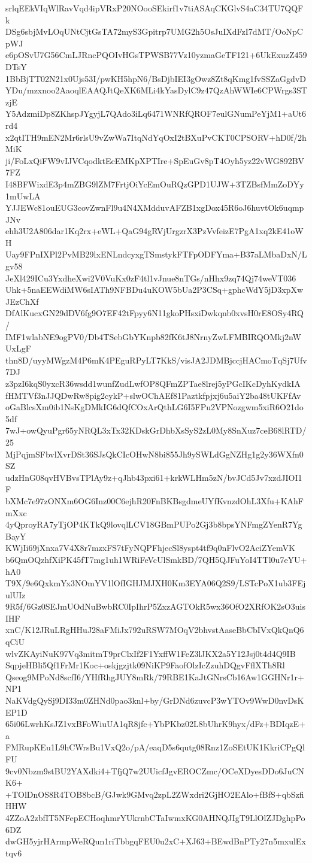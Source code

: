 srlqEEkVIqWlRavVqd4ipVRxP20NOooSEkirf1v7tiASAqCKGlvS4aC34TU7QQFk
DSg6sbjMvLOqUNtCjtGsTA72myS3Gpitrp7UMG2h5OsJuIXdFzI7dMT/OoNpCpWJ
e6pOSvU7G56CmLJRncPQOIvHGsTPWSB77Vz10yzmaGeTF121+6UkExuzZ459DTsY
1BbBjTT02N21x0Ujs53I/pwKH5hpN6/BsDjbIEI3gOwz8Zt8qKmg1fvSSZaGgdvD
YDu/mzxnoo2AaoqlEAAQJtQeXK6MLi4kYasDylC9z47QzAhWWIe6CPWrgs3STzjE
Y5AdzmiDp8ZKhspJYgyjL7QAdo3iLq6471WNRfQROF7eulGNumPeYjM1+aUt6rd4
x2qtITH9mEN2Mr6rlsU9vZwWa7ItqNdYqOxI2tBXuPvCKT0CPSORV+hD0f/2hMiK
ji/FoLxQiFW9vIJVCqodktEcEMKpXPTIre+SpEuGv8pT4Oyh5yz22vWG892BV7FZ
I48BFWixdE3p4mZBG9lZM7FrtjOiYcEmOuRQzGPD1UJW+3TZBsfMmZoDYy1mUwLA
YJJEWc81ouEUG3covZwnFl9u4N4XMdduvAFZB1xgDox45R6oJ6huvtOk6uqmpJNv
ehh3U2A806dar1Kq2rx+eWL+QaG94gRVjUrgzrX3PzVvfeizE7PgA1xq2kE41oWH
Uay9FPnIXPl2PvMB29lxENLndcyxgTSmstykFTFpODFYma+B37aLMbaDxN/Lgv58
JeXl429ICu3YxdheXwi2V0VuKx0zF4tl1vJnue8nTGs/nHhx9zq74Qj74weVT036
Uhk+5naEEWdiMW6sIATh9NFBDu4uKOW5bUa2P3CSq+gphcWdY5jD3xpXwJEzChXf
DfAlKucxGN29dDV6fg9O7EF42tFpyy6N11gkoPHsxiDwkqnb0xvsH0rE8OSy4RQ/
IMF1wlabNE9ogPV0/Db4TSebGbYKnpb82fK6tJ8NrnyZwLFMBIRQOMkj2nWUxLgF
thn8D/uyyMWgzM4P6mK4PEguRPyLT7KkS/visJA2JDMBjccjHACmoTqSj7Ufv7DJ
z3pzI6kqS0yxcR36wsdd1wunfZudLwfOP8QFmZPTae8lrej5yPGcIKcDyhKydkIA
fHMTVf3nJJQDwRw8pig2cykP+slwOChAEf81Paztkfpjxj6u5aiY2ba48tUKFfAv
oGaBlcsXm0ib1NsKgDMkIG6dQfCOxArQthLG6I5FPu2VPNozgwm5xiR6O21do5df
7wJ+owQyuPgr65yNRQL3xTx32KDskGrDhbXsSyS2zL0My8SnXuz7ceB68lRTD/25
MjPqjmSFbvlXvrDSt36SJsQkCIcOHwN8bi855Jh9ySWLdGgNZHg1g2y36WXfn0SZ
udzHnG08qvHVBvsTPlAy9z+qJhb43pxi61+krkWLHm5zN/bvJCd5Jv7xzdJIOI1F
bXMc7e97zONXm6OG6Inz00C6ejhR20FnBKBsgdmeUYfKvnzdOhL3Xfu+KAhFmXxc
4yQproyRA7yTjOP4KTkQ9lovqlLCV18GBmPUPo2Gj3b8bpsYNFmgZYenR7YgBayY
KWjIi69jXnxa7V4X8r7mzxFS7tFyNQPFhjecSl8yspt4tf9q0nFlvO2AciZYemVK
b6QmOQzhfXiPK45fT7mg1uh1WRiFeVcUlSmkBD/7QH5QJFuYoI4TTl0u7eYU+hA0
T9X/9e6QxkmYx3NOmYV1lOfIGHJMJXH0Km3EYA06Q2S9/LSTcPoX1ub3FEjulUIz
9R5f/6Gz0SEJmUOdNuBwbRC0IpIhrP5ZxzAGTOkR5wx36OfO2XRfOK2sO3uisIHF
xnC/K12JRuLRgHHuJ28aFMiJx792uRSW7MOqV2bhvstAaseBbCbIVxQkQnQ6qCiU
wlvZKAyiNuK97Vq3mitmT9prClxIf2F1YxffW1FeZ3lJKX2a5Y12Jsj0t4d4Q9IB
SqpjeHBli5Qf1FrMr1Koc+oskjgzjtk09NiKP9FaofOlzIcZzuhDQgvFflXTh8Rl
Qseog9MPoNd8scfI6/YHfRhgJUY8mRk/79RBE1KaJtGNrsCb16Aw1GGHNr1r+NP1
NaKVdgQySj9DI33m0ZHNd0pao3knl+by/GrDNd6zuvcP3wYTOv9WwD0nvDsKEP1D
65i06LwrhKsJZ1vxBFoWiuUA1qR8jfc+YbPKbz02L8bUhrK9hyx/dFz+BDIqzE+a
FMRupKEu1L9hCWrsBu1VxQ2o/pA/eaqD5s6qutg08Rnz1ZoSEtUK1KkriCPgQlFU
9cv0Nbzm9stBU2YAXdki4+TfjQ7w2UUicfJgvEROCZmc/OCeXDyesDDo6JuCNK6+
+TOlDnOS8R4TOB8bcB/GJwk9GMvq2zpL2ZWxdri2GjHO2EAlo+fBfS+qbSzfiHHW
4ZZoA2zbfIT5NFepECHoqhmrYUkrnbCTaIwmxKG0AHNQJIgT9LlOlZJDghpPo6DZ
dwGH5yjrHArmpWeRQun1riTbbgqFEU0u2xC+XJ63+BEwdBnPTy27n5mxulExtqv6

